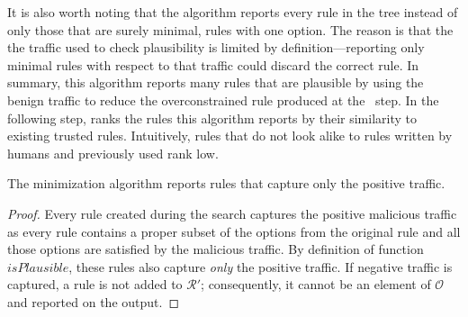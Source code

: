 \documentclass[sigconf,review, anonymous]{acmart}
\begin{document}
It is also worth noting that the algorithm reports every rule in the
tree instead of only those that are surely minimal, \ie{} rules with
one option. The reason is that the the traffic used to check
plausibility is limited by definition---reporting only minimal rules
with respect to that traffic could discard the correct rule. In
summary, this algorithm reports many rules that are plausible by using
the benign traffic to reduce the overconstrained rule produced at the
\reveng\ step. In the following step, \tname{} ranks the rules this
algorithm reports by their similarity to existing trusted
rules. Intuitively, rules that do not look alike to rules written by
humans and previously used rank low.

\begin{proposition}
  The minimization algorithm reports rules that capture only the
  positive traffic.
\end{proposition}
\begin{proof}
  Every rule created during the search captures the positive malicious
  traffic as every rule contains a proper subset of the options from
  the original rule and all those options are satisfied by the
  malicious traffic. By definition of function $\mathit{isPlausible}$,
  these rules also capture \emph{only} the positive traffic. If
  negative traffic is captured, a rule is not added to $\mathcal R'$;
  consequently, it cannot be an element of $\mathcal O$ and reported
  on the output.
\end{proof}



\end{document}
